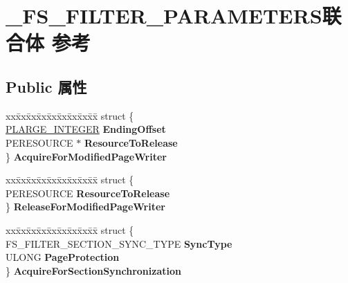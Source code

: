 \hypertarget{union___f_s___f_i_l_t_e_r___p_a_r_a_m_e_t_e_r_s}{}\section{\+\_\+\+F\+S\+\_\+\+F\+I\+L\+T\+E\+R\+\_\+\+P\+A\+R\+A\+M\+E\+T\+E\+R\+S联合体 参考}
\label{union___f_s___f_i_l_t_e_r___p_a_r_a_m_e_t_e_r_s}
\subsection*{Public 属性}
\begin{DoxyCompactItemize}
\item 
\mbox{\label{union___f_s___f_i_l_t_e_r___p_a_r_a_m_e_t_e_r_s_acf1c58ffc2a08dfa23282a0894a44ea2}} 
\begin{tabbing}
xx\=xx\=xx\=xx\=xx\=xx\=xx\=xx\=xx\=\kill
struct \{\\
\>\hyperlink{union___l_a_r_g_e___i_n_t_e_g_e_r}{PLARGE\_INTEGER} {\bfseries EndingOffset}\\
\>PERESOURCE $\ast$ {\bfseries ResourceToRelease}\\
\} {\bfseries AcquireForModifiedPageWriter}\\

\end{tabbing}\item 
\mbox{\label{union___f_s___f_i_l_t_e_r___p_a_r_a_m_e_t_e_r_s_adb475297c3dcea11ac405ec554924aad}} 
\begin{tabbing}
xx\=xx\=xx\=xx\=xx\=xx\=xx\=xx\=xx\=\kill
struct \{\\
\>PERESOURCE {\bfseries ResourceToRelease}\\
\} {\bfseries ReleaseForModifiedPageWriter}\\

\end{tabbing}\item 
\mbox{\label{union___f_s___f_i_l_t_e_r___p_a_r_a_m_e_t_e_r_s_a2f78ea825a3651a38f0ccc93c1d18da2}} 
\begin{tabbing}
xx\=xx\=xx\=xx\=xx\=xx\=xx\=xx\=xx\=\kill
struct \{\\
\>FS\_FILTER\_SECTION\_SYNC\_TYPE {\bfseries SyncType}\\
\>ULONG {\bfseries PageProtection}\\
\} {\bfseries AcquireForSectionSynchronization}\\


\end{tabbing}
\end{DoxyCompactItemize}
